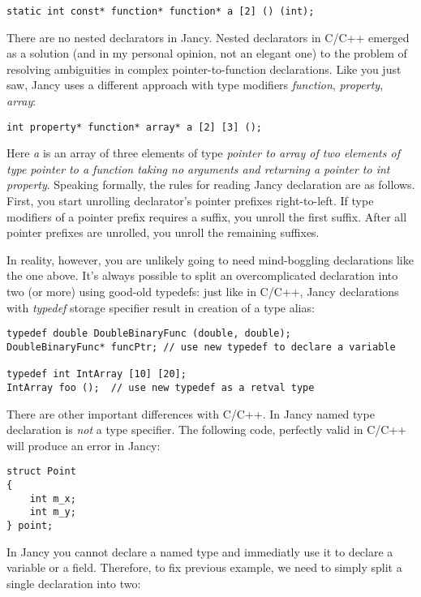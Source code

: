 \documentclass[oneside]{book}
\begin{document}
\begin{lstlisting}
static int const* function* function* a [2] () (int);
\end{lstlisting}

There are no nested declarators in Jancy. Nested declarators in C/C++ emerged as a solution (and in my personal opinion, not an elegant one) to the problem of resolving ambiguities in complex pointer-to-function declarations. Like you just saw, Jancy uses a different approach with type modifiers \emph{function}, \emph{property}, \emph{array}:

\begin{lstlisting}
int property* function* array* a [2] [3] ();
\end{lstlisting}

Here \emph{a} is an array of three elements of type \emph{pointer to array of two elements of type pointer to a function taking no arguments and returning a pointer to int property}. Speaking formally, the rules for reading Jancy declaration are as follows. First, you start unrolling declarator's pointer prefixes right-to-left. If type modifiers of a pointer prefix requires a suffix, you unroll the first suffix. After all pointer prefixes are unrolled, you unroll the remaining suffixes. 

In reality, however, you are unlikely going to need mind-boggling declarations like the one above. It's always possible to split an overcomplicated declaration into two (or more) using good-old typedefs: just like in C/C++, Jancy declarations with \emph{typedef} storage specifier result in creation of a type alias:

\begin{lstlisting}
typedef double DoubleBinaryFunc (double, double);
DoubleBinaryFunc* funcPtr; // use new typedef to declare a variable

typedef int IntArray [10] [20];
IntArray foo ();  // use new typedef as a retval type
\end{lstlisting}

There are other important differences with C/C++. In Jancy named type declaration is \emph{not} a type specifier. The following code, perfectly valid in C/C++ will produce an error in Jancy:

\begin{lstlisting}
struct Point
{
	int m_x;
	int m_y;
} point;
\end{lstlisting}

In Jancy you cannot declare a named type and immediatly use it to declare a variable or a field. Therefore, to fix previous example, we need to simply split a single declaration into two:
\end{document}
